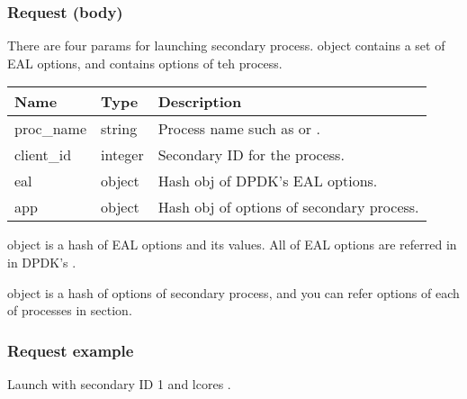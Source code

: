 \documentclass[a4paper,11pt,openany,oneside,english]{sphinxmanual}
\begin{document}
\subsubsection{Request (body)}
\label{\detokenize{api_ref/spp_primary:id17}}
There are four params for launching secondary process.  object
contains a set of EAL options, and  contains options of teh process.


\begin{savenotes}\sphinxattablestart
\centering
{}
\sphinxthecaptionisattop
{}\label{\detokenize{api_ref/spp_primary:id39}}\label{\detokenize{api_ref/spp_primary:table-spp-ctl-spp-primary-launch-body}}
\sphinxaftertopcaption
\begin{tabulary}{\linewidth}[t]{|T|T|T|}
\hline
\sphinxstyletheadfamily 
Name
&\sphinxstyletheadfamily 
Type
&\sphinxstyletheadfamily 
Description
\\
\hline
proc\_name
&
string
&
Process name such as  or .
\\
\hline
client\_id
&
integer
&
Secondary ID for the process.
\\
\hline
eal
&
object
&
Hash obj of DPDK’s EAL options.
\\
\hline
app
&
object
&
Hash obj of options of secondary process.
\\
\hline
\end{tabulary}
\par
\sphinxattableend\end{savenotes}

 object is a hash of EAL options and its values. All of EAL options
are referred in
in DPDK’s
.

 object is a hash of options of secondary process, and you can refer
options of each of processes in
section.


\subsubsection{Request example}
\label{\detokenize{api_ref/spp_primary:id18}}
Launch  with secondary ID 1 and lcores .
\end{document}
